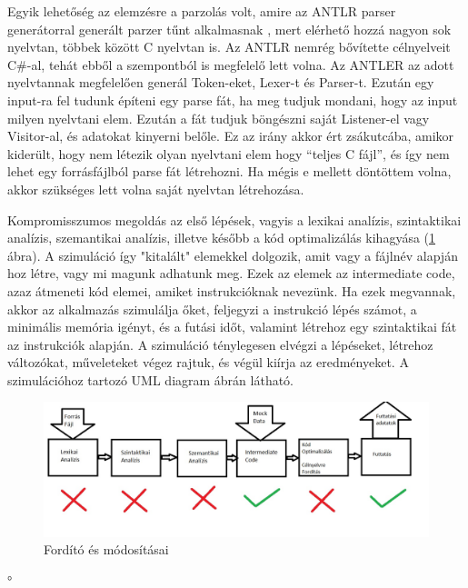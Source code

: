 Egyik lehetőség az elemzésre a parzolás volt, amire az ANTLR parser generátorral generált parzer tűnt alkalmasnak \cite{antlr}, mert elérhető hozzá nagyon sok nyelvtan, többek között C nyelvtan is. Az ANTLR nemrég bővítette célnyelveit C{\#}-al, tehát ebből a szempontból is megfelelő lett volna. Az ANTLER az adott nyelvtannak megfelelően generál Token-eket, Lexer-t és Parser-t. Ezután egy input-ra fel tudunk építeni egy parse fát, ha meg tudjuk mondani, hogy az input milyen nyelvtani elem. Ezután a fát tudjuk böngészni saját Listener-el vagy Visitor-al, és adatokat kinyerni belőle. Ez az irány akkor ért zsákutcába, amikor kiderült, hogy nem létezik olyan nyelvtani elem hogy “teljes C fájl”, és így nem lehet egy forrásfájlból parse fát létrehozni. Ha mégis e mellett döntöttem volna, akkor szükséges lett volna saját nyelvtan létrehozása.

Kompromisszumos megoldás az első lépések, vagyis a lexikai analízis, szintaktikai analízis, szemantikai analízis, illetve később a kód optimalizálás kihagyása (\ref{fig:compiler} ábra). A szimuláció így "kitalált" elemekkel dolgozik, amit vagy a fájlnév alapján hoz létre, vagy mi magunk adhatunk meg. Ezek az elemek az intermediate code, azaz átmeneti kód elemei, amiket instrukcióknak nevezünk. Ha ezek megvannak, akkor az alkalmazás szimulálja őket, feljegyzi a instrukció lépés számot, a minimális memória igényt, és a futási időt, valamint létrehoz egy szintaktikai fát az instrukciók alapján. A szimuláció ténylegesen elvégzi a lépéseket, létrehoz változókat, műveleteket végez rajtuk, és végül kiírja az eredményeket. A szimulációhoz tartozó UML diagram  ábrán látható.



\begin{figure}[h]
\centering
\includegraphics[scale=0.4]{images/Compiler.jpg}
\caption{Fordító és módosításai}
\label{fig:compiler}
\end{figure}



°%

